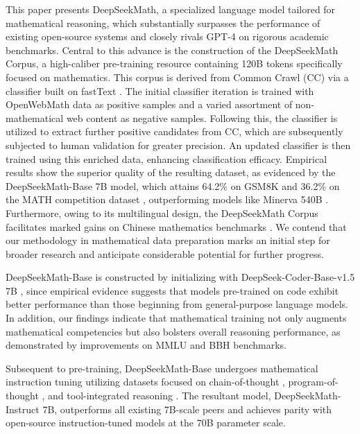 This paper presents DeepSeekMath, a specialized language model tailored for mathematical reasoning, which substantially surpasses the performance of existing open-source systems and closely rivals GPT-4 on rigorous academic benchmarks. Central to this advance is the construction of the DeepSeekMath Corpus, a high-caliber pre-training resource containing 120B tokens specifically focused on mathematics. This corpus is derived from Common Crawl (CC) via a classifier built on fastText \citep{joulin2016fasttext}. The initial classifier iteration is trained with OpenWebMath \citep{openwebmath} data as positive samples and a varied assortment of non-mathematical web content as negative samples. Following this, the classifier is utilized to extract further positive candidates from CC, which are subsequently subjected to human validation for greater precision. An updated classifier is then trained using this enriched data, enhancing classification efficacy. Empirical results show the superior quality of the resulting dataset, as evidenced by the DeepSeekMath-Base 7B model, which attains 64.2\% on GSM8K \citep{gsm8k} and 36.2\% on the MATH competition dataset \citep{MATH}, outperforming models like Minerva 540B \citep{minerva}. Furthermore, owing to its multilingual design, the DeepSeekMath Corpus facilitates marked gains on Chinese mathematics benchmarks \citep{wei2023cmath,agieval}. We contend that our methodology in mathematical data preparation marks an initial step for broader research and anticipate considerable potential for further progress.

DeepSeekMath-Base is constructed by initializing with DeepSeek-Coder-Base-v1.5 7B \citep{deepseek-coder}, since empirical evidence suggests that models pre-trained on code exhibit better performance than those beginning from general-purpose language models. In addition, our findings indicate that mathematical training not only augments mathematical competencies but also bolsters overall reasoning performance, as demonstrated by improvements on MMLU \citep{mmlu} and BBH \citep{bbh} benchmarks.

Subsequent to pre-training, DeepSeekMath-Base undergoes mathematical instruction tuning utilizing datasets focused on chain-of-thought \citep{cot}, program-of-thought \citep{pot,pal}, and tool-integrated reasoning \citep{tora}. The resultant model, DeepSeekMath-Instruct 7B, outperforms all existing 7B-scale peers and achieves parity with open-source instruction-tuned models at the 70B parameter scale.


